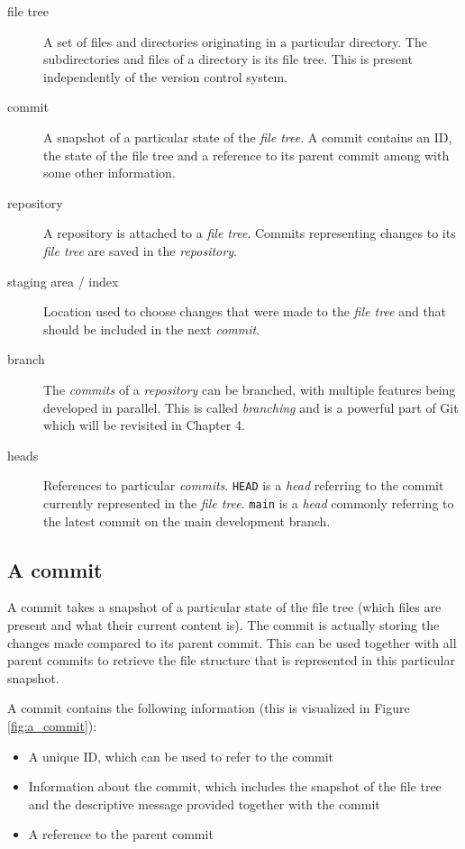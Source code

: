 \documentclass[../main/git_course_main.tex]{subfiles}
\begin{document}
	\begin{description}
		\item[file tree] A set of files and directories originating in a particular directory. The subdirectories and files of a directory is its file tree. This is present independently of the version control system.
		\item[commit] A snapshot of a particular state of the \textit{file tree}. A commit contains an ID, the state of the file tree and a reference to its parent commit among with some other information.
		\item[repository] A repository is attached to a \textit{file tree}. Commits representing changes to its \textit{file tree} are saved in the \textit{repository}.
		\item[staging area / index] Location used to choose changes that were made to the \textit{file tree} and that should be included in the next \textit{commit}.
		\item[branch] The \textit{commits} of a \textit{repository} can be branched, with multiple features being developed in parallel. This is called \textit{branching} and is a powerful part of Git which will be revisited in Chapter 4.
		\item[heads] References to particular \textit{commits}. \verb$HEAD$ is a \textit{head} referring to the commit currently represented in the \textit{file tree}. \verb$main$ is a \textit{head} commonly referring to the latest commit on the main development branch.
	\end{description}
	
	\subsection{A commit}
	
	A commit takes a snapshot of a particular state of the file tree (which files are present and what their current content is). The commit is actually storing the changes made compared to its parent commit. This can be used together with all parent commits to retrieve the file structure that is represented in this particular snapshot.
	
	A commit contains the following information (this is visualized in Figure \ref{fig:a_commit}):
	
	\begin{itemize}
		\item A unique ID, which can be used to refer to the commit
		\item Information about the commit, which includes the snapshot of the file tree and the descriptive message provided together with the commit
		\item A reference to the parent commit
	\end{itemize}
	
\end{document}
